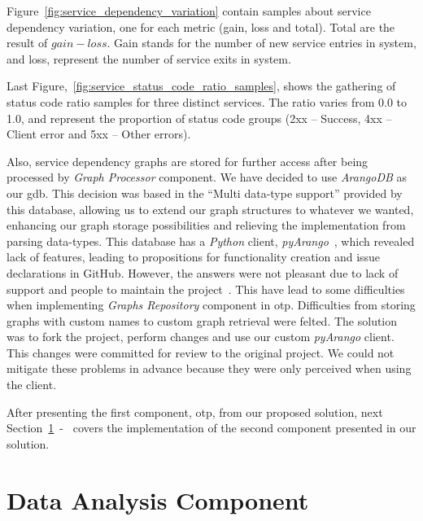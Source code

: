 Figure~\ref{fig:service_dependency_variation} contain samples about service dependency variation, one for each metric (gain, loss and total). Total are the result of $gain - loss$. Gain stands for the number of new service entries in system, and loss, represent the number of service exits in system.

Last Figure,~\ref{fig:service_status_code_ratio_samples}, shows the gathering of status code ratio samples for three distinct services. The ratio varies from 0.0 to 1.0, and represent the proportion of status code groups (2xx -- Success, 4xx -- Client error and 5xx -- Other errors).

Also, service dependency graphs are stored for further access after being processed by \emph{Graph Processor} component. We have decided to use \emph{ArangoDB} as our \gls{gdb}. This decision was based in the ``Multi data-type support'' provided by this database, allowing us to extend our graph structures to whatever we wanted, enhancing our graph storage possibilities and relieving the implementation from parsing data-types. This database has a \emph{Python} client, \emph{pyArango}~\cite{pyarango}, which revealed lack of features, leading to propositions for functionality creation and issue declarations in GitHub. However, the answers were not pleasant due to lack of support and people to maintain the project~\cite{arango_issues}. This have lead to some difficulties when implementing \emph{Graphs Repository} component in \gls{otp}. Difficulties from storing graphs with custom names to custom graph retrieval were felted. The solution was to fork the project, perform changes and use our custom \emph{pyArango} client. This changes were committed for review to the original project. We could not mitigate these problems in advance because they were only perceived when using the client.


After presenting the first component, \gls{otp}, from our proposed solution, next Section~\ref{sec:data_analysis_component}~-~ covers the implementation of the second component presented in our solution.

\section{Data Analysis Component}
\label{sec:data_analysis_component}

